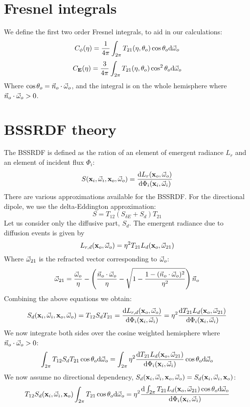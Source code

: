 \documentclass[10pt,a4paper]{article}
\begin{document}
\section{Fresnel integrals}
We define the first two order Fresnel integrals, to aid in our calculations:
$$
C_{\phi}(\eta) = \frac{1}{4\pi}\int_{2\pi} T_{21}(\eta,\theta_o)\cos \theta_o \text{d} \vec{\omega}_o
$$
$$
C_{\mathbf{E}}(\eta) = \frac{3}{4\pi}\int_{2\pi} T_{21}(\eta,\theta_o)\cos^2 \theta_o \text{d} \vec{\omega}_o
$$
Where $\cos\theta_o = \vec{n}_o \cdot \vec{\omega}_o$, and the integral is on the whole hemisphere where $\vec{n}_o \cdot \vec{\omega}_o > 0$.

\section{BSSRDF theory}
The BSSRDF is defined as the ration of an element of emergent radiance $L_r$ and an element of incident flux $\Phi_i$:
$$
S(\mathbf{x}_i, \vec{\omega}_i, \mathbf{x}_o, \vec{\omega}_o) = \frac{\text{d} L_r(\mathbf{x}_o, \vec{\omega}_o)}{\text{d} \Phi_i(\mathbf{x}_i, \vec{\omega}_i)}
$$
There are various approximations available for the BSSRDF. For the directional dipole, we use the delta-Eddington approximation:
$$
S = T_{12} (S_{\delta E} + S_d) T_{21}
$$
Let us consider only the diffusive part, $S_d$. The emergent radiance due to diffusion events is given by 
$$
L_{r,d}(\mathbf{x}_o, \vec{\omega}_o) = \eta^2 T_{21} L_{d}(\mathbf{x}_o, \vec{\omega}_{21}) 
$$ 
Where $\vec{\omega}_{21}$ is the refracted vector corresponding to $\vec{\omega}_{o}$:
$$
\vec{\omega}_{21} = \frac{\vec{\omega}_o}{\eta} - \left(\frac{\vec{n}_o \cdot \vec{\omega}_o}{\eta} - \sqrt{1 - \frac{1 - (\vec{n}_o \cdot \vec{\omega}_o
)^2}{\eta^2}}\right) \vec{n}_o 
$$
Combining the above equations we obtain:
$$
S_d(\mathbf{x}_i, \vec{\omega}_i, \mathbf{x}_o, \vec{\omega}_o) =  T_{12} S_d T_{21} = \frac{\text{d} L_{r,d}(\mathbf{x}_o, \vec{\omega}_o)}{\text{d} \Phi_i(\mathbf{x}_i, \vec{\omega}_i)} = \eta^2 \frac{\text{d} T_{21}  L_{d}(\mathbf{x}_o, \vec{\omega}_{21}) }{\text{d} \Phi_i(\mathbf{x}_i, \vec{\omega}_i)}
$$
We now integrate both sides over the cosine weighted hemisphere where $\vec{n}_o \cdot \vec{\omega}_o > 0$:
$$
\int_{2\pi} T_{12} S_d T_{21} \cos \theta_o \text{d} \vec{\omega}_o =  \int_{2\pi} \eta^2 \frac{\text{d} T_{21}  L_{d}(\mathbf{x}_o, \vec{\omega}_{21}) }{\text{d} \Phi_i(\mathbf{x}_i, \vec{\omega}_i)} \cos \theta_o \text{d} \vec{\omega}_o
$$
We now assume no directional dependency, $S_d(\mathbf{x}_i, \vec{\omega}_i, \mathbf{x}_o, \vec{\omega}_o) = S_d(\mathbf{x}_i, \vec{\omega}_i, \mathbf{x}_o)$:
$$
 T_{12} S_d(\mathbf{x}_i, \vec{\omega}_i, \mathbf{x}_o) \int_{2\pi} T_{21} \cos \theta_o \text{d} \vec{\omega}_o =   \eta^2 \frac{\text{d} \int_{2\pi} T_{21}  L_{d}(\mathbf{x}_o, \vec{\omega}_{21}) \cos \theta_o \text{d} \vec{\omega}_o}{\text{d} \Phi_i(\mathbf{x}_i, \vec{\omega}_i)} 
$$
\end{document}
